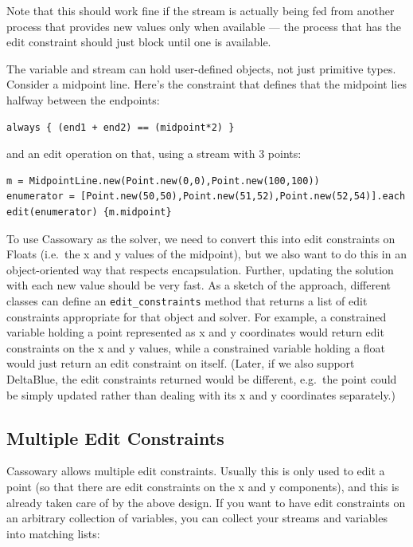 \documentclass[11pt]{article}
\begin{document}
Note that this should work fine if the stream is actually being fed
from another process that provides new values only when available ---
the process that has the edit constraint should just block until one
is available.

The variable and stream can hold user-defined objects, not just
primitive types.  Consider a midpoint line.  Here's the
constraint that defines that the midpoint lies halfway between the
endpoints:

\begin{lstlisting}
always { (end1 + end2) == (midpoint*2) }
\end{lstlisting}

and an edit operation on that, using a stream with 3 points:

\begin{lstlisting}
m = MidpointLine.new(Point.new(0,0),Point.new(100,100))
enumerator = [Point.new(50,50),Point.new(51,52),Point.new(52,54)].each
edit(enumerator) {m.midpoint}
\end{lstlisting}
            
To use Cassowary as the solver, we need to convert this into edit
constraints on Floats (i.e.\ the x and y values of the midpoint), but
we also want to do this in an object-oriented way that respects
encapsulation.  Further, updating the solution with each new value
should be very fast.  As a sketch of the approach, different classes
can define an \lstinline{edit_constraints} method that returns a list
of edit constraints appropriate for that object and solver.  For
example, a constrained variable holding a point represented as x and y
coordinates would return edit constraints on the x and y values, while
a constrained variable holding a float would just return an edit
constraint on itself.  (Later, if we also support DeltaBlue, the edit
constraints returned would be different, e.g.\ the point could be
simply updated rather than dealing with its x and y coordinates
separately.)

\subsection{Multiple Edit Constraints}

Cassowary allows multiple edit constraints.  Usually this is only used
to edit a point (so that there are edit constraints on the x and y
components), and this is already taken care of by the above design.
If you want to have edit constraints on an arbitrary collection of
variables, you can collect your streams and variables into matching
lists:
\end{document}
